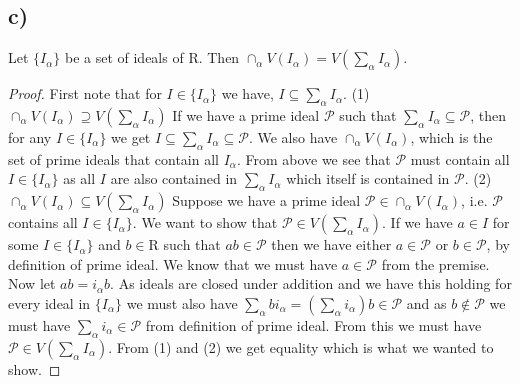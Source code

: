 \documentclass{article}
\theoremstyle{definition}
\begin{document}
\subsection*{c)}
Let $\{I_\alpha\}$ be a set of ideals of R. Then $\cap_\alpha V(I_\alpha)=V(\sum_{\alpha}I_\alpha)$.
\begin{proof}
First note that for $I\in\{I_{\alpha}\}$ we have, $I\subseteq\sum_{\alpha}I_{\alpha}$.
\newline\newline
(1)$\cap_\alpha V(I_\alpha)\supseteq V(\sum_{\alpha}I_\alpha)$
\newline
If we have a prime ideal $\mathcal{P}$ such that $\sum_{\alpha}I_{\alpha}\subseteq\mathcal{P}$, then for any $I\in\{I_{\alpha}\}$ we get $I\subseteq\sum_{\alpha}I_{\alpha}\subseteq\mathcal{P}$. We also have $\cap_\alpha V(I_\alpha)$, which is the set of prime ideals that contain all $I_{\alpha}$. From above we see that $\mathcal{P}$ must contain all $I\in\{I_{\alpha}\}$ as all $I$ are also contained in $\sum_{\alpha}I_{\alpha}$ which itself is contained in $\mathcal{P}$.
\newline\newline
(2)$\cap_\alpha V(I_\alpha)\subseteq V(\sum_{\alpha}I_\alpha)$
\newline
Suppose we have a prime ideal $\mathcal{P}\in\cap_\alpha V(I_\alpha)$, i.e. $\mathcal{P}$ contains all $I\in\{I_{\alpha}\}$. We want to show that $\mathcal{P}\in V(\sum_{\alpha}I_\alpha)$. If we have $a\in I$ for some $I\in\{I_{\alpha}\}$ and $b\in$R such that $ab\in\mathcal{P}$ then we have either $a\in\mathcal{P}$ or $b\in\mathcal{P}$, by definition of prime ideal. We know that we must have $a\in\mathcal{P}$ from the premise. Now let $ab=i_{\alpha}b$. As ideals are closed under addition and we have this holding for every ideal in $\{I_{\alpha}\}$ we must also have $\sum_{\alpha}bi_{\alpha}=(\sum_{\alpha}i_{\alpha})b\in\mathcal{P}$ and as $b\notin\mathcal{P}$ we must have $\sum_{\alpha}i_{\alpha}\in\mathcal{P}$ from definition of prime ideal. From this we must have $\mathcal{P}\in V(\sum_{\alpha}I_\alpha)$.
\newline\newline
From (1) and (2) we get equality which is what we wanted to show.
\end{proof}
\end{document}
